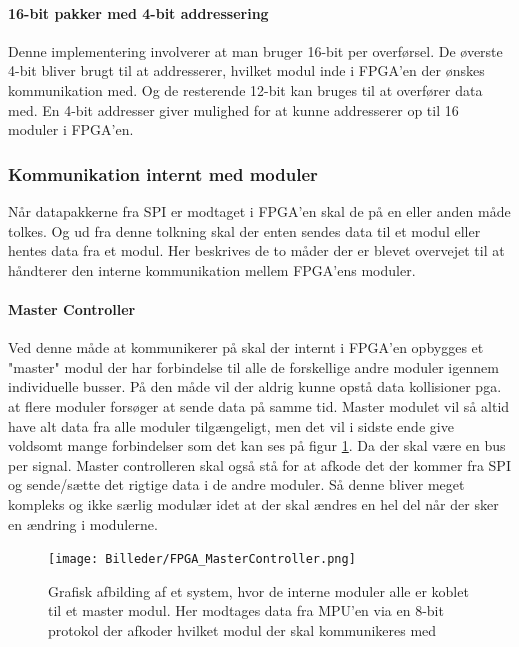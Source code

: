 \paragraph*{16-bit pakker med 4-bit addressering}
Denne implementering involverer at man bruger 16-bit per overførsel. De øverste 4-bit bliver brugt til at addresserer, hvilket modul inde i FPGA'en der ønskes kommunikation med. Og de resterende 12-bit kan bruges til at overfører data med. En 4-bit addresser giver mulighed for at kunne addresserer op til 16 moduler i FPGA'en.

\subsubsection{Kommunikation internt med moduler}
Når datapakkerne fra SPI er modtaget i FPGA'en skal de på en eller anden måde tolkes. Og ud fra denne tolkning skal der enten sendes data til et modul eller hentes data fra et modul. Her beskrives de to måder der er blevet overvejet til at håndterer den interne kommunikation mellem FPGA'ens moduler.

\paragraph*{Master Controller}
Ved denne måde at kommunikerer på skal der internt i FPGA'en opbygges et "master" modul der har forbindelse til alle de forskellige andre moduler igennem individuelle busser. På den måde vil der aldrig kunne opstå data kollisioner pga. at flere moduler forsøger at sende data på samme tid. Master modulet vil så altid have alt data fra alle moduler tilgængeligt, men det vil i sidste ende give voldsomt mange forbindelser som det kan ses på figur \ref{fig:FPGA_MasterController}. Da der skal være en bus per signal. Master controlleren skal også stå for at afkode det der kommer fra SPI og sende/sætte det rigtige data i de andre moduler. Så denne bliver meget kompleks og ikke særlig modulær idet at der skal ændres en hel del når der sker en ændring i modulerne.

\begin{figure}[ht]
	\begin{center}
		\texttt{[image: Billeder/FPGA\_MasterController.png]}
	\end{center}
\caption{Grafisk afbilding af et system, hvor de interne moduler alle er koblet til et master modul. Her modtages data fra MPU'en via en 8-bit protokol der afkoder hvilket modul der skal kommunikeres med}
\label{fig:FPGA_MasterController}
\end{figure}

